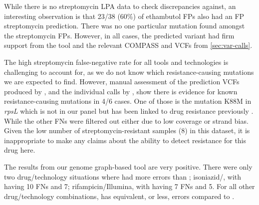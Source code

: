 While there is no streptomycin LPA data to check discrepancies against, an interesting observation is that 23/38 (60\%) of ethambutol FPs also had an FP streptomycin prediction. There was no one particular mutation found amongst the streptomycin FPs. However, in all cases, the predicted variant had firm support from the tool and the relevant COMPASS and \bcftools{} VCFs from \autoref{sec:var-calls}. 

The high streptomycin false-negative rate for all tools and technologies is challenging to account for, as we do not know which resistance-causing mutations we are expected to find. However, manual assessment of the prediction VCFs produced by \drprg{}, and the individual calls by \mykrobe{}, show there is evidence for known resistance-causing mutations in 4/6 cases. One of those is the mutation K88M in \textit{rpsL} which is not in our panel but has been linked to drug resistance previously \cite{Smittipat2016}. While the other FNs were filtered out either due to low coverage or strand bias. Given the low number of streptomycin-resistant samples (8) in this dataset, it is inappropriate to make any claims about the ability to detect resistance for this drug here.

The results from our genome graph-based tool \drprg{} are very positive. There were only two drug/technology situations where \drprg{} had more errors than \mykrobe{}; isoniazid/\ont{}, with \drprg{} having 10 FNs and \mykrobe{} 7; rifampicin/Illumina, with \drprg{} having 7 FNs and \mykrobe{} 5. For all other drug/technology combinations, \drprg{} has equivalent, or less, errors compared to \mykrobe{}.

